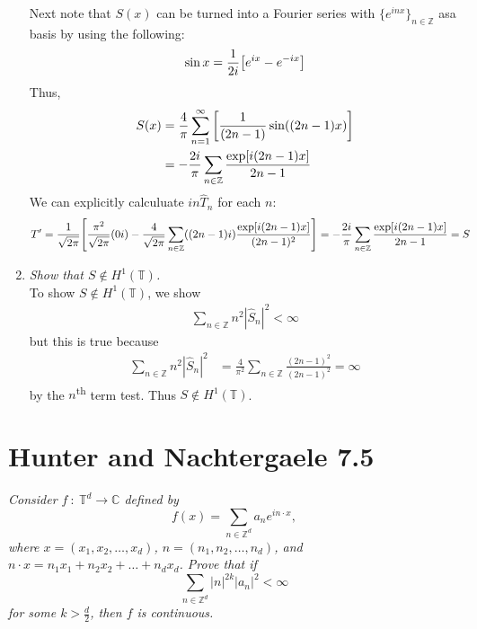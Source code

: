 \documentclass[12pt]{article}
\theoremstyle{plain}
\begin{document}
\begin{enumerate}[\bf (a)]
        Next note that $S(x)$ can be turned into a Fourier series with $\{e^{inx}\}_{n\in\mathbb{Z}}$ asa basis by using the following:
        \begin{align*}
            \sin x = \frac{1}{2i}\qty[e^{ix} - e^{-ix}]
        \end{align*}
        Thus,
        \begin{align*}
            S(x) &= \frac{4}{\pi}\sum_{n=1}^\infty\qty[\frac{1}{(2n-1)}\sin((2n-1)x)] \\
            &= -\frac{2i}{\pi}\sum_{n\in\mathbb{Z}}\frac{\exp[i(2n-1)x]}{2n-1}
        \end{align*}
        We can explicitly calculuate $in\hat{T}_n$ for each $n$:
        \begin{align*}
            T' = \frac{1}{\sqrt{2\pi}}\qty[\frac{\pi^2}{\sqrt{2\pi}}(0i) - \frac{4}{\sqrt{2\pi}}\sum_{n\in\mathbb{Z}}((2n-1)i)\frac{\exp[i(2n-1)x]}{(2n-1)^2}] &= -\frac{2i}{\pi}\sum_{n\in\mathbb{Z}}\frac{\exp[i(2n-1)x]}{2n-1} = S
        \end{align*}
    \item
        \emph{Show that $S \not\in H^1(\mathbb{T})$.} \\

        To show $S \not\in H^1(\mathbb{T})$, we show
        \begin{align*}
            \sum_{n\in\mathbb{Z}} n^2 |\hat{S}_n|^2 < \infty
        \end{align*}
        but this is true because
        \begin{align*}
            \sum_{n\in\mathbb{Z}} n^2 |\hat{S}_n|^2 &= \frac{4}{\pi^2}\sum_{n\in\mathbb{Z}} \frac{(2n-1)^2}{(2n-1)^2} = \infty
        \end{align*}
        by the $n$\textsuperscript{th} term test.  Thus $S \not\in H^1(\mathbb{T})$.
\end{enumerate}

\section*{Hunter and Nachtergaele 7.5}
\emph{Consider $f\ :\ \mathbb{T}^d \rightarrow \mathbb{C}$ defined by $$f(x) = \sum_{n\in\mathbb{Z}^d}a_n e^{i n \cdot x},$$ where $x = (x_1, x_2, \dots, x_d)$, $n = (n_1, n_2, \dots, n_d)$, and $n\cdot x = n_1x_1 + n_2x_2 + \dots + n_dx_d$.  Prove that if $$\sum_{n\in\mathbb{Z}^d}|n|^{2k}|a_n|^2 <\infty$$ for some $k > \frac{d}{2}$, then $f$ is continuous.} \\
\end{document}
